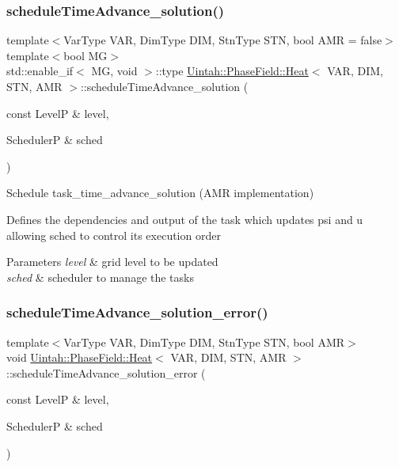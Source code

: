 \subsubsection{\texorpdfstring{schedule\+Time\+Advance\+\_\+solution()}{scheduleTimeAdvance\_solution()}\hspace{0.1cm}{\footnotesize\ttfamily [2/2]}}
{\footnotesize\ttfamily template$<$Var\+Type V\+AR, Dim\+Type D\+IM, Stn\+Type S\+TN, bool A\+MR = false$>$ \\
template$<$bool MG$>$ \\
std\+::enable\+\_\+if$<$ MG, void $>$\+::type \hyperlink{classUintah_1_1PhaseField_1_1Heat}{Uintah\+::\+Phase\+Field\+::\+Heat}$<$ V\+AR, D\+IM, S\+TN, A\+MR $>$\+::schedule\+Time\+Advance\+\_\+solution (\begin{DoxyParamCaption}\item[{const LevelP \&}]{level,  }\item[{SchedulerP \&}]{sched }\end{DoxyParamCaption})\hspace{0.3cm}{\ttfamily [protected]}}



Schedule task\+\_\+time\+\_\+advance\+\_\+solution (A\+MR implementation) 

Defines the dependencies and output of the task which updates psi and u allowing sched to control its execution order


\begin{DoxyParams}{Parameters}
{\em level} & grid level to be updated \\
\hline
{\em sched} & scheduler to manage the tasks \\
\hline
\end{DoxyParams}
\mbox{\label{classUintah_1_1PhaseField_1_1Heat_a30a952df198959dae461297e5fd05a4e}} 
\subsubsection{\texorpdfstring{schedule\+Time\+Advance\+\_\+solution\+\_\+error()}{scheduleTimeAdvance\_solution\_error()}}
{\footnotesize\ttfamily template$<$Var\+Type V\+AR, Dim\+Type D\+IM, Stn\+Type S\+TN, bool A\+MR$>$ \\
void \hyperlink{classUintah_1_1PhaseField_1_1Heat}{Uintah\+::\+Phase\+Field\+::\+Heat}$<$ V\+AR, D\+IM, S\+TN, A\+MR $>$\+::schedule\+Time\+Advance\+\_\+solution\+\_\+error (\begin{DoxyParamCaption}\item[{const LevelP \&}]{level,  }\item[{SchedulerP \&}]{sched }\end{DoxyParamCaption})\hspace{0.3cm}{\ttfamily [protected]}}



